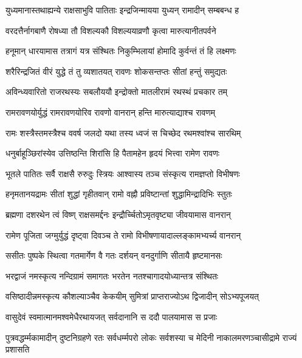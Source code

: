 \twolineshloka
{युध्यमानास्तथाह्यन्ये राक्षसाभुवि पातिताः}
{इन्द्रजिन्मायया युध्यन् रामादीन् सम्बबन्ध ह}%

\twolineshloka
{वरदत्तैर्नागबाणै रोषध्या तौ विशल्यकौ}
{विशल्ययाव्रणौ कृत्वा मारुत्यानीतपर्वने}%

\twolineshloka
{हनूमान् धारयामास तत्रागं यत्र संश्थितः}
{निकुम्भिलायां होमादि कुर्वन्तं तं हि लक्ष्मणः}%

\twolineshloka
{शरैरिन्द्रजितं वीरं युद्धे तं तु व्यशातयत्}
{रावणः शोकसन्तप्तः सीतां हन्तुं समुद्यतः}%

\twolineshloka
{अविन्ध्यवारितो राजरथस्यः सबलौययौ}
{इन्द्रोक्तो मातलीरामं रथस्थं प्रचकार तम्}%

\twolineshloka
{रामरावणयोर्युद्धं रामरावणयोरिव}
{रावणो वानरान् हन्ति मारुत्याद्याश्च रावणम्}%

\twolineshloka
{रामः शस्त्रैस्तमस्त्रैश्च ववर्ष जलदो यथा}
{तस्य ध्वजं स चिच्छेद रथमश्वांश्च सारथिम्}%

\twolineshloka
{धनुर्बाहूञ्छिरांस्येव उत्तिष्ठन्ति शिरांसि हि}
{पैतामहेन हृदयं भित्त्वा रामेण रावणः}%

\twolineshloka
{भूतले पातितः सर्वै राक्षसै रुरुदुः स्त्रियः}
{आश्वास्य तञ्च संस्कृत्य रामज्ञप्तो विभीषणः}%

\twolineshloka
{हनृमतानयद्रामः सीतां शुद्धां गृहीतवान्}
{रामो वह्नौ प्रविष्टान्तां शुद्धामिन्द्रादिभिः स्तुतः}%

\twolineshloka
{ब्रह्मणा दशरथेन त्वं विष्ण् राक्षसमर्द्दनः}
{इन्द्रौर्च्चितोऽमृतवृष्ट्या जीवयामास वानरान्}%

\twolineshloka
{रामेण पूजिता जग्मुर्युद्धं दृष्ट्वा दिवञ्च ते }
{रामो विभीषणायादाल्लङ्कामभ्यर्च्य वानरान्}%

\twolineshloka
{ससीतः पुष्पके स्थित्वा गतमार्गेण वै गतः}
{दर्शयन् वनदुर्गाणि सीतायै हृष्टमानसः}%

\twolineshloka
{भरद्वाजं नमस्कृत्य नन्दिग्रामं समागतः}
{भरतेन नतश्चागादयोध्यान्तत्र संश्थितः}%

\twolineshloka
{वसिष्ठादीन्नमस्कृत्य कौशल्याञ्चैव केकयीम् }
{सुमित्रां प्राप्तराज्योऽथ द्विजादीन् सोऽभ्यपूजयत्}%

\twolineshloka
{वासुदेवं स्वमात्मानमश्वमेधैरथायजत्}
{सर्वदानानि स ददौ पालयामास स प्रजाः}%

\threelineshloka
{पुत्रवद्धर्म्मकामादीन् दुष्टनिग्रहणे रतः}
{सर्वधर्म्मपरो लोकः सर्वशस्या च मेदिनी}
{नाकालमरणञ्चासीद्रामे राज्यं प्रशासति} %

